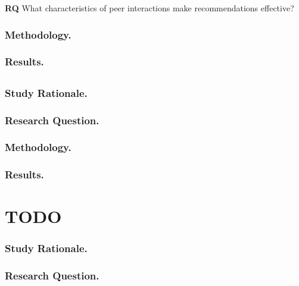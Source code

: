 \documentclass[runningheads]{llncs}
\begin{document}
\textbf{RQ} What characteristics of peer interactions make
recommendations effective?

\subsubsection{Methodology.}

\subsubsection{Results.}

\subsection{\TOOL}


\subsubsection{Study Rationale.}

\subsubsection{Research Question.}

\subsubsection{Methodology.}

\subsubsection{Results.}

\section{TODO} 


\subsubsection{Study Rationale.}

\subsubsection{Research Question.}
\end{document}
